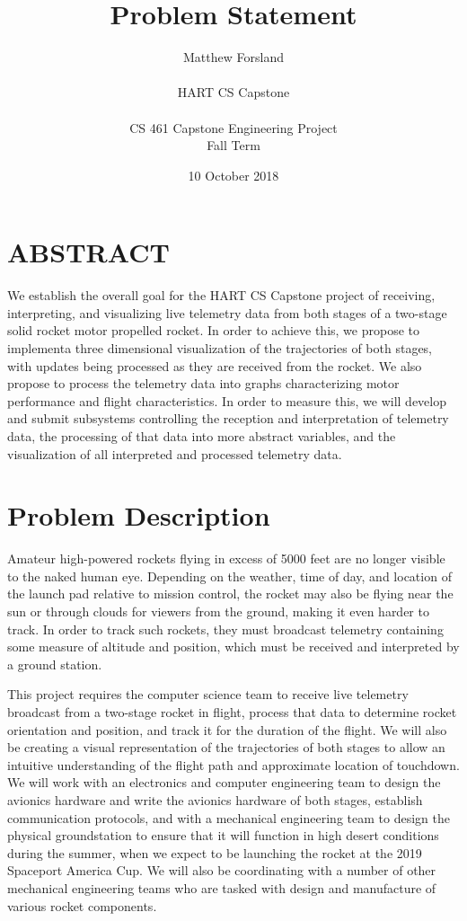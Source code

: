 \documentclass[10pt,draftclsnofoot,onecolumn]{article}
\title{Problem Statement}
\author{Matthew Forsland\\\\HART CS Capstone\\\\CS 461 Capstone Engineering Project\\Fall Term}
\date{10 October 2018}
\begin{document}
\maketitle

\section{ABSTRACT}
We establish the overall goal for the HART CS Capstone project of receiving, interpreting, and visualizing live telemetry data from both stages of a two-stage solid rocket motor propelled rocket. In order to achieve this, we propose to implementa three dimensional visualization of the trajectories of both stages, with updates being processed as they are received from the rocket. We also propose to process the telemetry data into graphs characterizing motor performance and flight characteristics. In order to measure this, we will develop and submit subsystems controlling the reception and interpretation of telemetry data, the processing of that data into more abstract variables, and the visualization of all interpreted and processed telemetry data.

\pagebreak

\section{Problem Description}

Amateur high-powered rockets flying in excess of 5000 feet are no longer visible to the naked human eye. Depending on the weather, time of day, and location of the launch pad relative to mission control, the rocket may also be flying near the sun or through clouds for viewers from the ground, making it even harder to track. In order to track such rockets, they must broadcast telemetry containing some measure of altitude and position, which must be received and interpreted by a ground station.

This project requires the computer science team to receive live telemetry broadcast from a two-stage rocket in flight, process that data to determine rocket orientation and position, and track it for the duration of the flight. We will also be creating a visual representation of the trajectories of both stages to allow an intuitive understanding of the flight path and approximate location of touchdown. We will work with an electronics and computer engineering team to design the avionics hardware and write the avionics hardware of both stages, establish communication protocols, and with a mechanical engineering team to design the physical groundstation to ensure that it will function in high desert conditions during the summer, when we expect to be launching the rocket at the 2019 Spaceport America Cup. We will also be coordinating with a number of other mechanical engineering teams who are tasked with design and manufacture of various rocket components.
\end{document}

